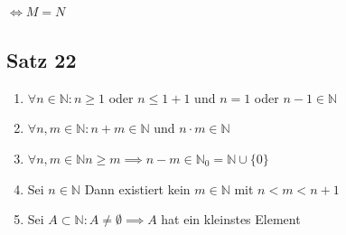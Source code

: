 \documentclass[fleqn]{scrbook}
\newcommand{\N}{\mathbb{N}}
\begin{document}
$\Longleftrightarrow M = N$

\subsection{Satz 22}
\begin{enumerate}[1)]
\item $\forall n \in \N: n \geq 1$ oder $n \leq 1 + 1$ und $n = 1$ oder $n-1 \in \N$
\item $\forall n,m \in \N: n+m \in \N$ und $n \cdot m \in \N$
\item $\forall n,m \in \N n \geq m \implies n-m \in \N_0 = \N \cup \{0\}$
\item Sei $n \in \N$ Dann existiert kein $m \in \N$ mit $n < m < n+1$
\item Sei $A \subset \N: A \neq \emptyset \implies A$ hat ein kleinstes Element
\end{enumerate}
\end{document}
